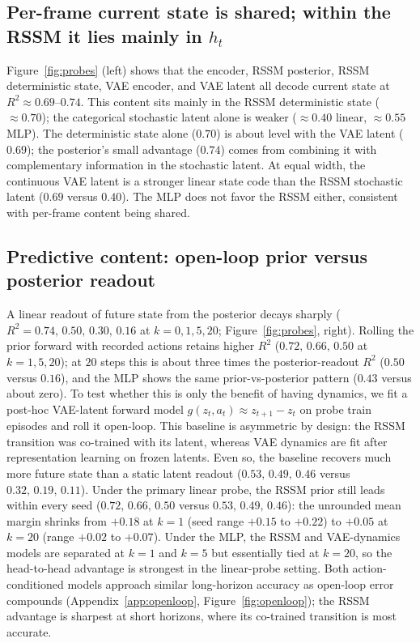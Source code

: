 \documentclass{article} %
\newcommand{\rtwo}{\ensuremath{R^2}}
\begin{document}
\subsection{Per-frame current state is shared; within the RSSM it lies mainly in $h_t$}
Figure~\ref{fig:probes} (left) shows that the encoder, RSSM posterior, RSSM
deterministic state, VAE encoder, and VAE latent all decode current state at
$R^2\approx0.69$--$0.74$. This content sits mainly in the RSSM deterministic
state ($\approx0.70$); the categorical stochastic latent alone is weaker
($\approx0.40$ linear, $\approx0.55$ MLP). The deterministic state alone
($0.70$) is about level with the VAE latent ($0.69$); the posterior's small
advantage ($0.74$) comes from combining it with complementary information in the
stochastic latent. At equal width, the continuous VAE
latent is a stronger linear state code than the RSSM stochastic latent
($0.69$ versus $0.40$). The MLP does not favor the RSSM either, consistent with
per-frame content being shared.

\subsection{Predictive content: open-loop prior versus posterior readout}
\label{sec:pred}
A linear readout of future state from the posterior decays sharply
($R^2 = 0.74,\,0.50,\,0.30,\,0.16$ at $k=0,1,5,20$; Figure~\ref{fig:probes},
right). Rolling the prior forward with recorded actions retains higher \rtwo{}
($0.72,\,0.66,\,0.50$ at $k=1,5,20$); at $20$ steps this is about three times
the posterior-readout \rtwo{} ($0.50$ versus $0.16$), and the MLP shows the same
prior-vs-posterior pattern ($0.43$ versus about zero). To test whether this is
only the benefit of having dynamics, we fit a post-hoc VAE-latent forward model
$g(z_t,a_t)\approx z_{t+1}-z_t$ on probe train episodes and roll it open-loop.
This baseline is asymmetric by design: the RSSM transition was co-trained with
its latent, whereas VAE dynamics are fit after representation learning on frozen
latents. Even so, the baseline recovers much more future state than a static
latent readout ($0.53,\,0.49,\,0.46$ versus $0.32,\,0.19,\,0.11$). Under the
primary linear probe, the RSSM prior still leads within every seed
($0.72,\,0.66,\,0.50$ versus $0.53,\,0.49,\,0.46$): the unrounded mean margin
shrinks from $+0.18$ at $k=1$ (seed range $+0.15$ to $+0.22$) to $+0.05$ at
$k=20$ (range $+0.02$ to $+0.07$). Under the MLP, the RSSM and VAE-dynamics
models are separated at $k=1$ and $k=5$ but essentially tied at $k=20$, so the
head-to-head advantage is strongest in the linear-probe setting. Both
action-conditioned models approach similar long-horizon accuracy as open-loop
error compounds (Appendix~\ref{app:openloop}, Figure~\ref{fig:openloop}); the
RSSM advantage is sharpest at short horizons, where its co-trained transition is
most accurate.
\end{document}
